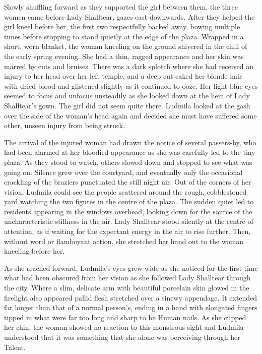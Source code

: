 Slowly shuffling forward as they supported the girl between them, the three women came before Lady Shalltear, gazes cast downwards. After they helped the girl kneel before her, the first two respectfully backed away, bowing multiple times before stopping to stand quietly at the edge of the plaza. Wrapped in a short, worn blanket, the woman kneeling on the ground shivered in the chill of the early spring evening. She had a thin, ragged appearance and her skin was marred by cuts and bruises. There was a dark splotch where she had received an injury to her head over her left temple, and a deep cut caked her blonde hair with dried blood and glistened slightly as it continued to ooze. Her light blue eyes seemed to focus and unfocus unsteadily as she looked down at the hem of Lady Shalltear’s gown. The girl did not seem quite there. Ludmila looked at the gash over the side of the woman’s head again and decided she must have suffered some other, unseen injury from being struck.

 

The arrival of the injured woman had drawn the notice of several passers-by, who had been alarmed at her bloodied appearance as she was carefully led to the tiny plaza. As they stood to watch, others slowed down and stopped to see what was going on. Silence grew over the courtyard, and eventually only the occasional crackling of the braziers punctuated the still night air. Out of the corners of her vision, Ludmila could see the people scattered around the rough, cobblestoned yard watching the two figures in the centre of the plaza. The sudden quiet led to residents appearing in the windows overhead, looking down for the source of the uncharacteristic stillness in the air. Lady Shalltear stood silently at the centre of attention, as if waiting for the expectant energy in the air to rise further. Then, without word or flamboyant action, she stretched her hand out to the woman kneeling before her.

 

As she reached forward, Ludmila’s eyes grew wide as she noticed for the first time what had been obscured from her vision as she followed Lady Shalltear through the city. Where a slim, delicate arm with beautiful porcelain skin glowed in the firelight also appeared pallid flesh stretched over a sinewy appendage. It extended far longer than that of a normal person’s, ending in a hand with elongated fingers tipped in what were far too long and sharp to be Human nails. As she cupped her chin, the woman showed no reaction to this monstrous sight and Ludmila understood that it was something that she alone was perceiving through her Talent.

